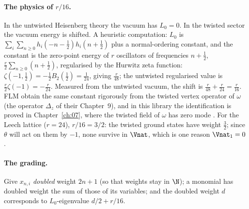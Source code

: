 \paragraph{The physics of $r/16$.}  In the untwisted Heisenberg theory the vacuum has
$L_0=0$.  In the twisted sector the vacuum energy is shifted.  A heuristic computation: $L_0$ is
$\sum_i\sum_{n\ge0}h_i(-n-\frac12)h_i(n+\frac12)$ plus a normal-ordering constant, and the
constant is the zero-point energy of $r$ oscillators of frequencies $n+\frac12$,
$\frac r2\sum_{n\ge 0}(n+\frac12)$, regularised by the Hurwitz zeta function:
$\zeta(-1,\tfrac12)=-\tfrac12B_2(\tfrac12)=\tfrac1{24}$, giving $\frac r{48}$; the untwisted
regularised value is $\frac r2\zeta(-1)=-\frac r{24}$.  Measured from the untwisted vacuum, the
shift is $\frac r{48}+\frac r{24}=\frac r{16}$.  FLM obtain the same constant rigorously from the
twisted vertex operator of $\omega$ (the operator $\Delta_z$ of their Chapter~9), and in this
library the identification is proved in Chapter~\ref{ch:07}, where the twisted field of $\omega$
has zero mode .  For the Leech lattice ($r=24$), $r/16=3/2$: the twisted ground states
have weight $\frac32$; since $\theta$ will act on them by $-1$, none survive in $\Vnat$, which is
one reason $\Vnat_1=0$.

\paragraph{The grading.}  Give $x_{n,i}$ \emph{doubled} weight $2n+1$ (so that weights stay in
$\N$); a monomial has doubled weight the sum of those of its variables; and the doubled weight $d$
corresponds to $L_0$-eigenvalue $d/2+r/16$.

